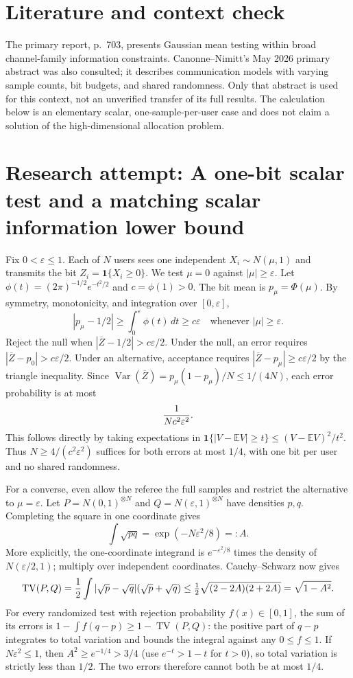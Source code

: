 \documentclass[11pt]{article}
\begin{document}
\section{Literature and context check}
The primary report, p.~703, presents Gaussian mean testing within broad channel-family information constraints. Canonne--Nimitt's May 2026 primary abstract was also consulted; it describes communication models with varying sample counts, bit budgets, and shared randomness. Only that abstract is used for this context, not an unverified transfer of its full results. The calculation below is an elementary scalar, one-sample-per-user case and does not claim a solution of the high-dimensional allocation problem.
\section{Research attempt: A one-bit scalar test and a matching scalar information lower bound}
Fix $0<\varepsilon\leq1$. Each of $N$ users sees one independent $X_i\sim N(\mu,1)$ and transmits the bit $Z_i=\mathbf1\{X_i\geq0\}$. We test $\mu=0$ against $|\mu|\geq\varepsilon$. Let $\phi(t)=(2\pi)^{-1/2}e^{-t^2/2}$ and $c=\phi(1)>0$. The bit mean is $p_\mu=\Phi(\mu)$. By symmetry, monotonicity, and integration over $[0,\varepsilon]$,
\[
 |p_\mu-1/2|\geq\int_0^\varepsilon\phi(t)\,dt\geq c\varepsilon
 \quad\text{whenever }|\mu|\geq\varepsilon.
\]
Reject the null when $|\overline Z-1/2|>c\varepsilon/2$. Under the null, an error requires $|\overline Z-p_0|>c\varepsilon/2$. Under an alternative, acceptance requires $|\overline Z-p_\mu|\geq c\varepsilon/2$ by the triangle inequality. Since $\operatorname{Var}(\overline Z)=p_\mu(1-p_\mu)/N\leq1/(4N)$, each error probability is at most
\[
 {1\over Nc^2\varepsilon^2}.
\]
This follows directly by taking expectations in $\mathbf1\{|V-\mathbb EV|\geq t\}\leq(V-\mathbb EV)^2/t^2$. Thus $N\geq4/(c^2\varepsilon^2)$ suffices for both errors at most $1/4$, with one bit per user and no shared randomness.

For a converse, even allow the referee the full samples and restrict the alternative to $\mu=\varepsilon$. Let $P=N(0,1)^{\otimes N}$ and $Q=N(\varepsilon,1)^{\otimes N}$ have densities $p,q$. Completing the square in one coordinate gives
\[
 \int\sqrt{p q}=\exp(-N\varepsilon^2/8)=:A.
\]
More explicitly, the one-coordinate integrand is $e^{-\varepsilon^2/8}$ times the density of $N(\varepsilon/2,1)$; multiply over independent coordinates. Cauchy--Schwarz now gives
\[
 \operatorname{TV}(P,Q)={1\over2}\int|\sqrt p-\sqrt q|(\sqrt p+\sqrt q)
 \leq\tfrac12\sqrt{(2-2A)(2+2A)}=\sqrt{1-A^2}.
\]
For every randomized test with rejection probability $f(x)\in[0,1]$, the sum of its errors is $1-\int f(q-p)\geq1-\operatorname{TV}(P,Q)$: the positive part of $q-p$ integrates to total variation and bounds the integral against any $0\leq f\leq1$. If $N\varepsilon^2\leq1$, then $A^2\geq e^{-1/4}>3/4$ (use $e^{-t}>1-t$ for $t>0$), so total variation is strictly less than $1/2$. The two errors therefore cannot both be at most $1/4$.
\end{document}
